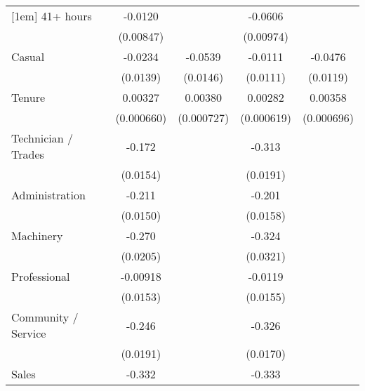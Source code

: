 {\begin{tabular}{l*{4}{c}}
[1em]
41+ hours           &     -0.0120         &                     &     -0.0606\sym{***}&                     \\
                    &   (0.00847)         &                     &   (0.00974)         &                     \\
[1em]
Casual              &     -0.0234         &     -0.0539\sym{***}&     -0.0111         &     -0.0476\sym{***}\\
                    &    (0.0139)         &    (0.0146)         &    (0.0111)         &    (0.0119)         \\
[1em]
Tenure              &     0.00327\sym{***}&     0.00380\sym{***}&     0.00282\sym{***}&     0.00358\sym{***}\\
                    &  (0.000660)         &  (0.000727)         &  (0.000619)         &  (0.000696)         \\
[1em]
Technician / Trades &      -0.172\sym{***}&                     &      -0.313\sym{***}&                     \\
                    &    (0.0154)         &                     &    (0.0191)         &                     \\
[1em]
Administration      &      -0.211\sym{***}&                     &      -0.201\sym{***}&                     \\
                    &    (0.0150)         &                     &    (0.0158)         &                     \\
[1em]
Machinery           &      -0.270\sym{***}&                     &      -0.324\sym{***}&                     \\
                    &    (0.0205)         &                     &    (0.0321)         &                     \\
[1em]
Professional        &    -0.00918         &                     &     -0.0119         &                     \\
                    &    (0.0153)         &                     &    (0.0155)         &                     \\
[1em]
Community / Service &      -0.246\sym{***}&                     &      -0.326\sym{***}&                     \\
                    &    (0.0191)         &                     &    (0.0170)         &                     \\
[1em]
Sales               &      -0.332\sym{***}&                     &      -0.333\sym{***}&                     \\

\end{tabular}}
